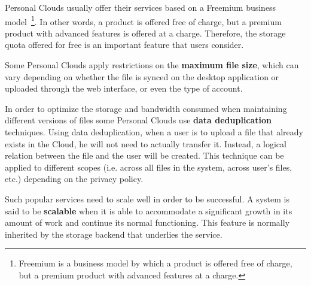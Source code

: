 Personal Clouds usually offer their services based on a Freemium business model~\footnote{Freemium is a business model by which a product is offered free of charge, but a premium product with advanced features at a charge.}. In other words, a product is offered free of charge, but a premium product with advanced features is offered at a charge. Therefore, the storage quota offered for free is an important feature that users consider.

Some Personal Clouds apply restrictions on the \textbf{maximum file size}, which can vary depending on whether the file is synced on the desktop application or uploaded through the web interface, or even the type of account.

In order to optimize the storage and bandwidth consumed when maintaining different versions of files some Personal Clouds use \textbf{data deduplication} techniques. Using data deduplication, when a user is to upload a file that already exists in the Cloud, he will not need to actually transfer it. Instead, a logical relation between the file and the user will be created. This technique can be applied to different scopes (i.e. across all files in the system, across user's files, etc.) depending on the privacy policy.

Such popular services need to scale well in order to be successful. A system is said to be \textbf{scalable} when it is able to accommodate a significant growth in its amount of work and continue its normal functioning. This feature is normally inherited by the storage backend that underlies the service.

